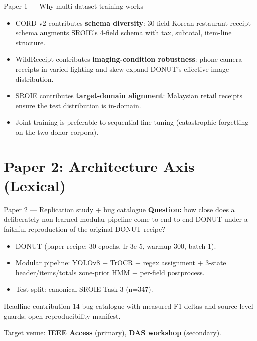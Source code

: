 \documentclass{beamer}
\begin{document}
\begin{frame}{Paper 1 --- Why multi-dataset training works}
  \begin{itemize}
    \item CORD-v2 contributes \textbf{schema diversity}: 30-field Korean
          restaurant-receipt schema augments SROIE's 4-field schema with
          tax, subtotal, item-line structure.
    \item WildReceipt contributes \textbf{imaging-condition robustness}:
          phone-camera receipts in varied lighting and skew expand
          DONUT's effective image distribution.
    \item SROIE contributes \textbf{target-domain alignment}: Malaysian
          retail receipts ensure the test distribution is in-domain.
    \item Joint training is preferable to sequential fine-tuning
          (catastrophic forgetting on the two donor corpora).
  \end{itemize}
\end{frame}

\section{Paper 2: Architecture Axis (Lexical)}
\begin{frame}{Paper 2 --- Replication study + bug catalogue}
  \textbf{Question:} how close does a deliberately-non-learned modular
  pipeline come to end-to-end DONUT under a faithful reproduction of the
  original DONUT recipe?
  \vspace{0.5em}
  \begin{itemize}
    \item DONUT (paper-recipe: 30 epochs, lr 3e-5, warmup-300, batch 1).
    \item Modular pipeline: YOLOv8 + TrOCR + regex assignment + 3-state
          header/items/totals zone-prior HMM + per-field postprocess.
    \item Test split: canonical SROIE Task-3 (n=347).
  \end{itemize}
  \begin{block}{Headline contribution}
    14-bug catalogue with measured F1 deltas and source-level guards;
    open reproducibility manifest.
  \end{block}
  Target venue: \textbf{IEEE Access} (primary), \textbf{DAS workshop}
  (secondary).
\end{frame}
\end{document}
